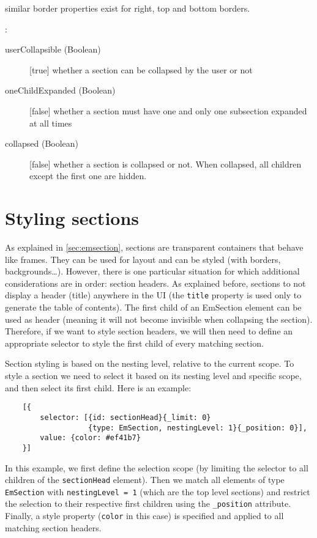 \begin{description}
\begin{description}
        \item similar border properties exist for right, top and bottom borders.
    \end{description}
    \item [section related styles (sections are explained later)] :
    \begin{description}
        \item[userCollapsible (Boolean)] [true] whether a section can be collapsed by the user or not
        \item[oneChildExpanded (Boolean)] [false] whether a section must have one and only one subsection expanded at all times
        \item[collapsed (Boolean)] [false] whether a section is collapsed or not. When collapsed, all children except the first one are hidden.
    \end{description}

\end{description}

\section{Styling sections}
\label{sec:styling_sections}

As explained in \ref{sec:emsection}, sections are transparent containers that behave like frames. They can be used for layout and can be styled (with borders, backgrounds\ldots). However, there is one particular situation for which additional considerations are in order: section headers. As explained before, sections to not display a header (title) anywhere in the UI (the \texttt{title} property is used only to generate the table of contents). The first child of an EmSection element can be used as header (meaning it will not become invisible when collapsing the section). Therefore, if we want to style section headers, we will then need to define an appropriate selector to style the first child of every matching section.

Section styling is based on the nesting level, relative to the current scope. To style a section we need to select it based on its nesting level and specific scope, and then select its first child. Here is an example:

\begin{verbatim}
    [{
        selector: [{id: sectionHead}{_limit: 0}
                   {type: EmSection, nestingLevel: 1}{_position: 0}],
        value: {color: #ef41b7}
    }]
\end{verbatim}

In this example, we first define the selection scope (by limiting the selector to all children of the \texttt{sectionHead} element). Then we match all elements of type \texttt{EmSection} with \texttt{nestingLevel = 1} (which are the top level sections) and restrict the selection to their respective first children using the \texttt{\_position} attribute. Finally, a style property (\texttt{color} in this case) is specified and applied to all matching section headers.
